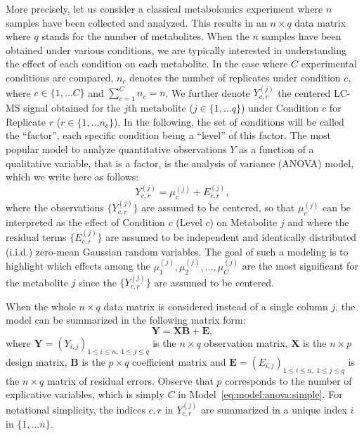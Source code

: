 More precisely, let us consider a classical metabolomics experiment
where $n$ samples have been collected and analyzed. This results in an $n \times q$ data matrix where $q$ stands for the number of metabolites.
When the $n$ samples have been obtained under various conditions, we
are typically interested in understanding the effect of each condition
on each metabolite. In the case where $C$ experimental conditions are
compared, $n_c$ denotes the number of replicates under condition $c$, where
$c \in \{1, \dots C\}$ and $\sum_{c=1}^Cn_c = n$. 
We further denote $Y_{c, r}^{(j)}$ the centered LC-MS signal obtained
for the $j$th metabolite ($j \in \{1, \dots q\}$) under Condition $c$ 
for Replicate $r$ ($r \in \{1, \dots n_c\}$). 
In the following, the set of conditions will be called the
``factor'', each specific condition being a ``level'' of this factor. 
The most popular model to analyze quantitative observations $Y$ as a
function of a qualitative variable, that is a factor,
is the analysis of variance (ANOVA) model, which we write here as follows:
\begin{equation}\label{eq:model:anova:simple}
 Y_{c, r}^{(j)} = \mu_c^{(j)} + E_{c, r}^{(j)},
\end{equation}
where the observations $\{Y_{c, r}^{(j)}\}$ are assumed to be centered, so that $\mu_c^{(j)}$ can be interpreted as the effect of Condition $c$ (Level $c$) on
Metabolite $j$ and where the residual terms $\{E_{c, r}^{(j)}\}$ are
assumed to be independent and identically distributed (i.i.d.)
zero-mean Gaussian random variables. 
The goal of such a modeling is to highlight which effects among the
$\mu_1^{(j)},\mu_2^{(j)},\dots,\mu_C^{(j)}$ are the most significant
for the metabolite $j$ since the $\{Y_{c, r}^{(j)}\}$ are assumed to be centered.

When the whole $n \times q$ data matrix is considered instead of a
  single column $j$, 
the model can be summarized in the following matrix form:
\begin{equation}\label{eq:model:matriciel}
\boldsymbol{Y}=\boldsymbol{X}\boldsymbol{B}+\boldsymbol{E},
\end{equation}
where $\boldsymbol{Y}=(Y_{i,j})_{1\leq i\leq n,\; 1\leq j\leq q}$ is
the $n\times q$ observation matrix, $\boldsymbol{X}$ is the $n\times p$ design matrix,
$\boldsymbol{B}$ is the $p\times q$ coefficient matrix and
 $\boldsymbol{E}=(E_{i,j})_{1\leq i\leq n,\; 1\leq j\leq q}$ is the
 $n\times q$ matrix of residual errors. Observe that $p$
 corresponds to the number of explicative variables,
   which is simply $C$ in Model~\eqref{eq:model:anova:simple}.
For notational simplicity, the indices $c,r$ in $Y_{c,r}^{(j)}$ are
summarized in a unique index $i$ in $\{1, \dots n\}$.

